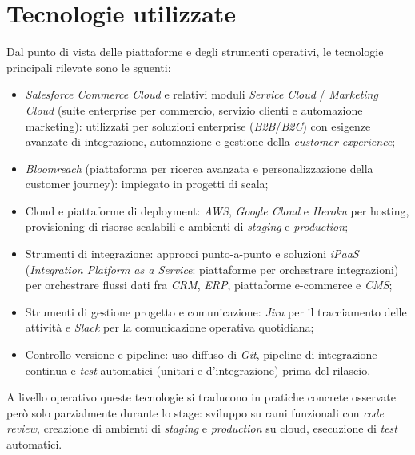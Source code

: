 \section{Tecnologie utilizzate}

Dal punto di vista delle piattaforme e degli strumenti operativi, le tecnologie principali rilevate sono le sguenti:
\begin{itemize}
\item \emph{Salesforce Commerce Cloud} e relativi moduli \emph{Service Cloud} / \emph{Marketing Cloud} (suite enterprise per commercio, servizio clienti e automazione marketing): utilizzati per soluzioni enterprise (\emph{B2B}/\emph{B2C}) con esigenze avanzate di integrazione, automazione e gestione della \emph{customer experience};
\item \emph{Bloomreach} (piattaforma per ricerca avanzata e personalizzazione della customer journey): impiegato in progetti di scala;
\item Cloud e piattaforme di deployment: \emph{AWS}, \emph{Google Cloud} e \emph{Heroku} per hosting, provisioning di risorse scalabili e ambienti di \emph{staging} e \emph{production};
\item Strumenti di integrazione: approcci punto-a-punto e soluzioni \emph{iPaaS} (\emph{Integration Platform as a Service}: piattaforme per orchestrare integrazioni) per orchestrare flussi dati fra \emph{CRM}, \emph{ERP}, piattaforme e-commerce e \emph{CMS};
\item Strumenti di gestione progetto e comunicazione: \emph{Jira} per il tracciamento delle attività e \emph{Slack} per la comunicazione operativa quotidiana;
\item Controllo versione e pipeline: uso diffuso di \emph{Git}, pipeline di integrazione continua e \emph{test} automatici (unitari e d’integrazione) prima del rilascio.
\end{itemize}

A livello operativo queste tecnologie si traducono in pratiche concrete osservate però solo parzialmente durante lo stage: sviluppo su rami funzionali con \emph{code review}, 
creazione di ambienti di \emph{staging} e \emph{production} su cloud, esecuzione di \emph{test} automatici.

